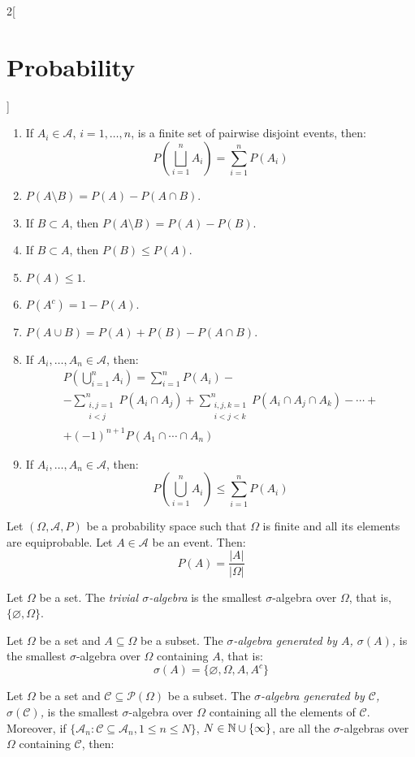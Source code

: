 \documentclass[../../../main.tex]{subfiles}
\begin{document}
\begin{multicols}{2}[\section{Probability}]
\begin{prop}
\begin{enumerate}
      \item If $A_i\in\mathcal{A}$, $i=1,\ldots,n$, is a finite set of pairwise disjoint events, then: $$P\left(\bigsqcup_{i=1}^n A_i\right)=\sum_{i=1}^n P(A_i)$$
      \item $P(A\setminus B) =P(A)-P(A\cap B)$.
      \item If $B\subset A$, then $P(A\setminus B)=P(A)-P(B)$.
      \item If $B\subset A$, then $P(B)\leq P(A)$.
      \item $P(A)\leq 1$.
      \item $P(A^c)=1-P(A)$.
      \item $P(A\cup B) =P(A)+P(B)-P(A\cap B)$.
      \item If $A_i,\ldots,A_n\in\mathcal{A}$, then:
            \begin{multline*}
              P\left(\bigcup_{i=1}^n A_i\right)=\sum_{i=1}^n P(A_i)-\\-\sum_{\substack{i,j=1\\i<j}}^nP(A_i\cap A_j)+\sum_{\substack{i,j,k=1\\i<j<k}}^nP(A_i\cap A_j\cap A_k)-\cdots+\\+{(-1)}^{n+1}P(A_1\cap\cdots\cap A_n)
            \end{multline*}
      \item If $A_i,\ldots,A_n\in\mathcal{A}$, then: $$P\left(\bigcup_{i=1}^n A_i\right)\leq\sum_{i=1}^n P(A_i)$$
    \end{enumerate}
  \end{prop}
  \begin{prop}
    Let $(\Omega,\mathcal{A},P)$ be a probability space such that $\Omega$ is finite and all its elements are equiprobable. Let $A\in\mathcal{A}$ be an event. Then: $$P(A)=\frac{|A|}{|\Omega|}$$
  \end{prop}
  \begin{definition}
    Let $\Omega$ be a set. The \textit{trivial $\sigma$-algebra} is the smallest $\sigma$-algebra over $\Omega$, that is, $\{\varnothing,\Omega\}$.
  \end{definition}
  \begin{definition}
    Let $\Omega$ be a set and $A\subseteq\Omega$ be a subset. The \textit{$\sigma$-algebra generated by $A$, $\sigma(A)$,} is the smallest $\sigma$-algebra over $\Omega$ containing $A$, that is: $$\sigma(A)=\{\varnothing,\Omega,A,A^c\}$$
  \end{definition}
  \begin{definition}
    Let $\Omega$ be a set and $\mathcal{C}\subseteq\mathcal{P}(\Omega)$ be a subset. The \textit{$\sigma$-algebra generated by $\mathcal{C}$, $\sigma(\mathcal{C})$,} is the smallest $\sigma$-algebra over $\Omega$ containing all the elements of $\mathcal{C}$. Moreover, if $\{\mathcal{A}_n:\mathcal{C}\subseteq\mathcal{A}_n,1\leq n\leq N\}$, $N\in\mathbb{N}\cup\{\infty\}$, are all the $\sigma$-algebras over $\Omega$ containing $\mathcal{C}$, then:

\end{definition}
\end{multicols}
\end{document}
